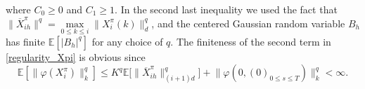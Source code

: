 \documentclass[12pt]{article}
\numberwithin{equation}{section}
\newcommand{\abs}[1]{\lvert#1\rvert}
\newcommand{\norm}[1]{\lVert#1\rVert}
\newcommand{\E}{\mathbb{E}}
\begin{document}
where $C_0 \ge 0$ and $C_1 \ge 1$.
In the second last inequality we used the fact that
$\norm{\overline{X}^\pi_{ih}}^q = \max\limits_{0 \leq k \leq i} \norm{X^\pi_i(k)}_d^q$,
and the centered Gaussian random variable $B_h$
has finite $\E \left[ \abs{B_h}^q \right]$ for any choice of $q$.
The finiteness of the second term in \eqref{regularity_Xpi}
is obvious since
\begin{equation*}
    \E \left[\norm{\varphi(X^\pi_i)}_k^q\right] \le
                K^q \E \big[\norm{\overline{X}^\pi_{ih}}_{(i+1)d}^q \big] +
                    \norm{\varphi(0,(0)_{0\leq s\leq T})}_k^q
        < \infty.
\end{equation*}


\footnotesize

\end{document}
